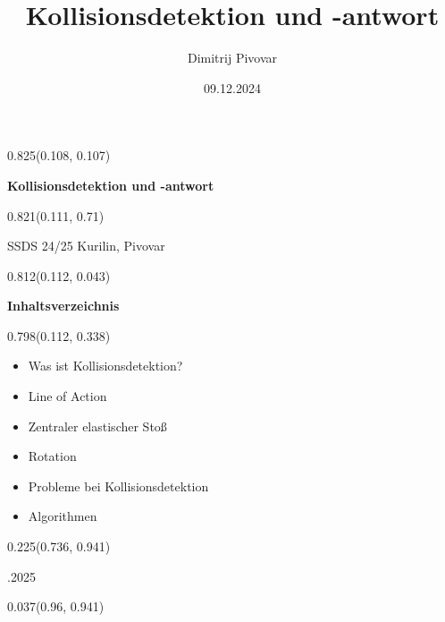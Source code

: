 \documentclass[aspectratio=169]{beamer}
\title{Kollisionsdetektion und -antwort}
\author[Dimitrij Pivovar]{Dimitrij Pivovar}
\institute{16.11.2025}
\date{09.12.2024}
\begin{document}
\begin{frame}
  \titlepage
\end{frame}


\begin{frame}[fragile]
\begin{textblock}{0.825}(0.108, 0.107)
  \begin{minipage}[b][0.427\paperheight]{\linewidth}
    \textbf{Kollisionsdetektion und -antwort}
  \end{minipage}
\end{textblock}

\begin{textblock}{0.821}(0.111, 0.71)
  \begin{minipage}[t][0.213\paperheight]{\linewidth}
    {\small SSDS 24/25 Kurilin, Pivovar}
  \end{minipage}
\end{textblock}
\end{frame}

\begin{frame}[fragile]
\begin{textblock}{0.812}(0.112, 0.043)
  \begin{minipage}[t][0.151\paperheight]{\linewidth}
    \textbf{Inhaltsverzeichnis}
  \end{minipage}
\end{textblock}

\begin{textblock}{0.798}(0.112, 0.338)
  \begin{minipage}[t][0.537\paperheight]{\linewidth}
    {\scriptsize
    \begin{itemize}
      \item Was ist Kollisionsdetektion?
      \item Line of Action
      \item Zentraler elastischer Stoß
      \item Rotation
      \item Probleme bei Kollisionsdetektion
      \item Algorithmen
    \end{itemize}
    }
  \end{minipage}
\end{textblock}

\begin{textblock}{0.225}(0.736, 0.941)
  \begin{minipage}[b][0.053\paperheight]{\linewidth}
    \raggedright
    \fontsize{3}{3.3}.2025
  \end{minipage}
\end{textblock}

\begin{textblock}{0.037}(0.96, 0.941)
  \begin{minipage}[b][0.053\paperheight]{\linewidth}
    \raggedright
    \fontsize{3}{3.3}
  \end{minipage}
\end{textblock}
\end{frame}
\end{document}
